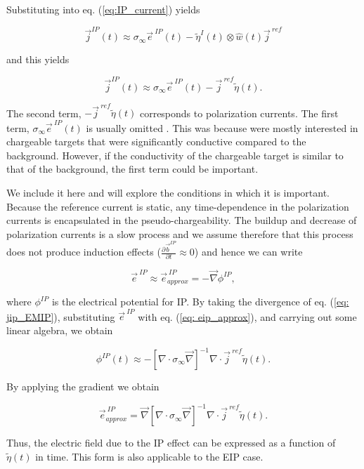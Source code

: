 \documentclass[extra,mreferee]{gji}
\renewcommand{\div}{\nabla\cdot}
\newcommand{\grad}{\vec \nabla}
\newcommand{\siginf}{\sigma_\infty}
\renewcommand {\j}  { {\vec j} }
\renewcommand {\b}  { {\vec b} }
\newcommand {\e}  { {\vec e} }
\newcommand{\peta}{\tilde{\eta}}
\newcommand{\jref}{\j^{\ ref}}
\begin{document}
Substituting into eq. (\ref{eq:IP_current}) yields
\begin{linenomath*}
\begin{equation}
  \j^{IP}(t) \approx \siginf\e^{\ IP}(t) - \peta^{I}(t)\otimes \hat{w}(t)\jref
\end{equation}
\end{linenomath*}
and this yields
\begin{linenomath*}
\begin{equation}
  \j^{IP}(t) \approx \siginf\e^{\ IP}(t) -\jref\peta(t).
  \label{eq: jip_EMIP}
\end{equation}
\end{linenomath*}

The second term, $-\jref\peta(t)$ corresponds to polarization currents. The first term, $\siginf \e^{\ IP}(t)$ is usually omitted \cite[]{Smith1988a}. This was because \cite{Smith1988a} were mostly interested in chargeable targets that were significantly conductive compared to the background. However, if the conductivity of the chargeable target is similar to that of the background, the first term could be important.

We include it here and will explore the conditions in which it is important.
Because the reference current is static, any time-dependence in the polarization currents is encapsulated in the pseudo-chargeability. The buildup and decrease of polarization currents is a slow process and we assume therefore that this process does not produce induction effects ($\frac{\partial \b^{IP}}{\partial t} \approx 0$) and hence we can write
\begin{linenomath*}
\begin{equation}
  \e^{\ IP} \approx  \e^{\ IP}_{approx} = -\grad\phi^{IP},
  \label{eq: eip_approx}
\end{equation}
\end{linenomath*}
where $\phi^{IP}$ is the electrical potential for IP.
By taking the divergence of  eq. (\ref{eq: jip_EMIP}), substituting  $\e^{\ IP}$ with eq. (\ref{eq: eip_approx}), and carrying out some linear algebra, we obtain
\begin{linenomath*}
\begin{equation}
  \phi^{IP}(t) \approx -[\div \siginf\grad]^{-1}\div\jref\peta(t).
  \label{eq: phiIPapprox_general}
\end{equation}
\end{linenomath*}
By applying the gradient we obtain
\begin{linenomath*}
\begin{equation}
    \e^{\ IP}_{approx} = \grad[\div \siginf\grad]^{-1}\div\jref\peta(t).
    \label{eq: eip_approx_full}
\end{equation}
\end{linenomath*}
Thus, the electric field due to the IP effect can be expressed as a function of $\peta(t)$ in time.
This form is also applicable to the  EIP case.
\end{document}
